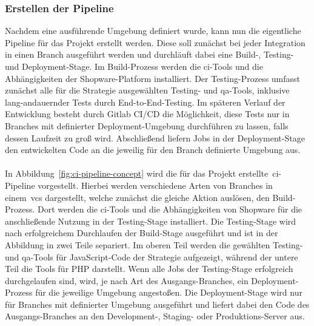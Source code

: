 \subsubsection{Erstellen der Pipeline}

Nachdem eine ausführende Umgebung definiert wurde, kann nun die eigentliche Pipeline für das Projekt erstellt werden.
Diese soll zunächst bei jeder Integration in einen Branch ausgeführt werden und durchläuft dabei eine Build-,
Testing- und Deployment-Stage.
Im Build-Prozess werden die \acrshort{ci}-Tools und die Abhängigkeiten der Shopware-Platform installiert.
Der Testing-Prozess umfasst zunächst alle für die Strategie ausgewählten Testing- und \acrshort{qa}-Tools, inklusive
lang-andauernder Tests durch End-to-End-Testing.
Im späteren Verlauf der Entwicklung besteht durch Gitlab CI/CD die Möglichkeit, diese Tests nur in Branches mit
definierter Deployment-Umgebung durchführen zu lassen, falls dessen Laufzeit zu groß wird.
Abschließend liefern Jobs in der Deployment-Stage den entwickelten Code an die jeweilig für den Branch definierte
Umgebung aus.
\\\\
In Abbildung\ \ref{fig:ci-pipeline-concept} wird die für das Projekt erstellte\ \acrshort{ci}-Pipeline vorgestellt.
Hierbei werden verschiedene Arten von Branches in einem\ \acrshort{vcs} dargestellt, welche zunächst die gleiche Aktion
auslösen, den Build-Prozess.
Dort werden die \acrshort{ci}-Tools und die Abhängigkeiten von Shopware für die anschließende Nutzung in der
Testing-Stage installiert.
Die Testing-Stage wird nach erfolgreichem Durchlaufen der Build-Stage ausgeführt und ist in der Abbildung in zwei
Teile separiert.
Im oberen Teil werden die gewählten Testing- und \acrshort{qa}-Tools für JavaScript-Code der Strategie aufgezeigt,
während der untere Teil die Tools für PHP darstellt.
Wenn alle Jobs der Testing-Stage erfolgreich durchgelaufen sind, wird, je nach Art des Ausgangs-Branches, ein
Deployment-Prozess für die jeweilige Umgebung angestoßen.
Die Deployment-Stage wird nur für Branches mit definierter Umgebung ausgeführt und liefert dabei den Code des
Ausgangs-Branches an den Development-, Staging- oder Produktions-Server aus.

